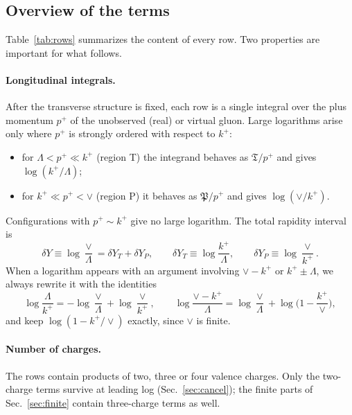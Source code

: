 \subsection{Overview of the terms}\label{sec:rows}

Table~\ref{tab:rows} summarizes the content of every row. Two properties are important for what follows.

\paragraph*{Longitudinal integrals.} After the transverse structure is fixed, each row is a single integral over the plus momentum $p^+$ of the unobserved (real) or virtual gluon. Large logarithms arise only where $p^+$ is strongly ordered with respect to $k^+$:
\begin{itemize}
\item for $\Lambda<p^+\ll k^+$ (region T) the integrand behaves as $\mathfrak T/p^+$ and gives $\log(k^+/\Lambda)$;
\item for $k^+\ll p^+<\vee$ (region P) it behaves as $\mathfrak P/p^+$ and gives $\log(\vee/k^+)$.
\end{itemize}
Configurations with $p^+\sim k^+$ give no large logarithm. The total rapidity interval is
\begin{equation}
\delta Y\equiv\log\frac{\vee}{\Lambda}=\delta Y_T+\delta Y_P,\qquad \delta Y_T\equiv\log\frac{k^+}{\Lambda},\qquad \delta Y_P\equiv\log\frac{\vee}{k^+}.
\label{eq:dYdef}
\end{equation}
When a logarithm appears with an argument involving $\vee-k^+$ or $k^+\pm\Lambda$, we always rewrite it with the identities
\begin{equation}
\log\frac{\Lambda}{k^+}=-\log\frac{\vee}{\Lambda}+\log\frac{\vee}{k^+},\qquad \log\frac{\vee-k^+}{\Lambda}=\log\frac{\vee}{\Lambda}+\log\Big(1-\frac{k^+}{\vee}\Big),
\label{eq:logid}
\end{equation}
and keep $\log(1-k^+/\vee)$ exactly, since $\vee$ is finite.

\paragraph*{Number of charges.} The rows contain products of two, three or four valence charges. Only the two-charge terms survive at leading log (Sec.~\ref{sec:cancel}); the finite parts of Sec.~\ref{sec:finite} contain three-charge terms as well.

